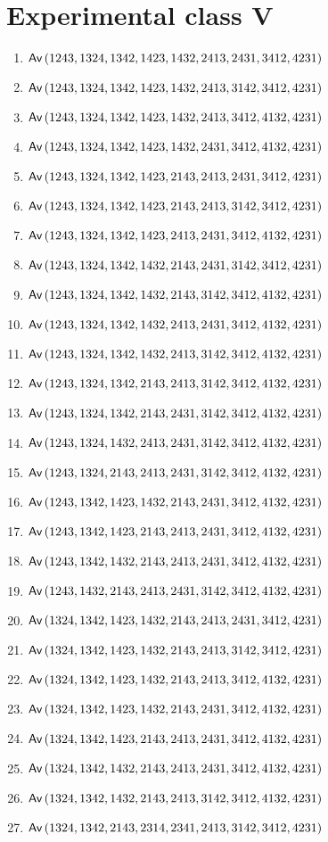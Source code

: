 \section{Experimental class V}
\begin{enumerate}
\item $\textsf{Av}\left(1243,1324,1342,1423,1432,2413,2431,3412,4231\right)$
\item $\textsf{Av}\left(1243,1324,1342,1423,1432,2413,3142,3412,4231\right)$
\item $\textsf{Av}\left(1243,1324,1342,1423,1432,2413,3412,4132,4231\right)$
\item $\textsf{Av}\left(1243,1324,1342,1423,1432,2431,3412,4132,4231\right)$
\item $\textsf{Av}\left(1243,1324,1342,1423,2143,2413,2431,3412,4231\right)$
\item $\textsf{Av}\left(1243,1324,1342,1423,2143,2413,3142,3412,4231\right)$
\item $\textsf{Av}\left(1243,1324,1342,1423,2413,2431,3412,4132,4231\right)$
\item $\textsf{Av}\left(1243,1324,1342,1432,2143,2431,3142,3412,4231\right)$
\item $\textsf{Av}\left(1243,1324,1342,1432,2143,3142,3412,4132,4231\right)$
\item $\textsf{Av}\left(1243,1324,1342,1432,2413,2431,3412,4132,4231\right)$
\item $\textsf{Av}\left(1243,1324,1342,1432,2413,3142,3412,4132,4231\right)$
\item $\textsf{Av}\left(1243,1324,1342,2143,2413,3142,3412,4132,4231\right)$
\item $\textsf{Av}\left(1243,1324,1342,2143,2431,3142,3412,4132,4231\right)$
\item $\textsf{Av}\left(1243,1324,1432,2413,2431,3142,3412,4132,4231\right)$
\item $\textsf{Av}\left(1243,1324,2143,2413,2431,3142,3412,4132,4231\right)$
\item $\textsf{Av}\left(1243,1342,1423,1432,2143,2431,3412,4132,4231\right)$
\item $\textsf{Av}\left(1243,1342,1423,2143,2413,2431,3412,4132,4231\right)$
\item $\textsf{Av}\left(1243,1342,1432,2143,2413,2431,3412,4132,4231\right)$
\item $\textsf{Av}\left(1243,1432,2143,2413,2431,3142,3412,4132,4231\right)$
\item $\textsf{Av}\left(1324,1342,1423,1432,2143,2413,2431,3412,4231\right)$
\item $\textsf{Av}\left(1324,1342,1423,1432,2143,2413,3142,3412,4231\right)$
\item $\textsf{Av}\left(1324,1342,1423,1432,2143,2413,3412,4132,4231\right)$
\item $\textsf{Av}\left(1324,1342,1423,1432,2143,2431,3412,4132,4231\right)$
\item $\textsf{Av}\left(1324,1342,1423,2143,2413,2431,3412,4132,4231\right)$
\item $\textsf{Av}\left(1324,1342,1432,2143,2413,2431,3412,4132,4231\right)$
\item $\textsf{Av}\left(1324,1342,1432,2143,2413,3142,3412,4132,4231\right)$
\item $\textsf{Av}\left(1324,1342,2143,2314,2341,2413,3142,3412,4231\right)$
\end{enumerate}

